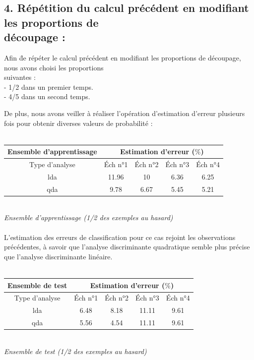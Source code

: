 \documentclass[a4paper, 10pt]{article}
\begin{document}
\subsection*{4. Répétition du calcul précédent en modifiant les proportions de\\découpage :}
\begin{tabbing}
Afin \= de répéter le calcul précédent en modifiant les proportions de découpage, nous avons choisi les proportions\\suivantes :\\
\> - 1/2 dans un premier temps.\\
\> - 4/5 dans un second temps.
\end{tabbing}
De plus, nous avons veiller à réaliser l'opération d'estimation d'erreur plusieurs fois pour obtenir diverses valeurs de probabilité :\\ \\
\begin{tabular}{|c|c|c|c|c|}
\hline
\textbf{Ensemble d'apprentissage} & \multicolumn{4}{|c|}{Estimation d'erreur ($\%$)} \\
\hline
Type d'analyse & Éch n°1 & Éch n°2 & Éch n°3 & Éch n°4 \\
\hline
lda & 11.96 & 10 & 6.36 & 6.25 \\
\hline
qda & 9.78 & 6.67 & 5.45 & 5.21 \\
\hline
\end{tabular}\\
\textit{Ensemble d'apprentissage (1/2 des exemples au hasard)}\\ \\
L'estimation des erreurs de classification pour ce cas rejoint les observations précédentes,
à savoir que l'analyse discriminante quadratique semble plus précise que l'analyse discriminante linéaire.\\ \\
\begin{tabular}{|c|c|c|c|c|}
\hline
\textbf{Ensemble de test} & \multicolumn{4}{|c|}{Estimation d'erreur ($\%$)} \\
\hline
Type d'analyse & Éch n°1 & Éch n°2 & Éch n°3 & Éch n°4 \\
\hline
lda & 6.48 & 8.18 & 11.11 & 9.61 \\
\hline
qda & 5.56 & 4.54 & 11.11 & 9.61 \\
\hline
\end{tabular}\\
\textit{Ensemble de test (1/2 des exemples au hasard)}\\ \\
\end{document}
